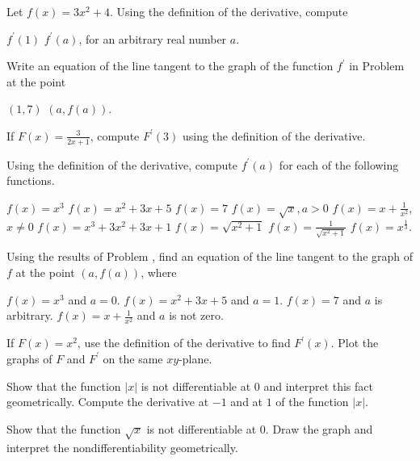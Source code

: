 \begin{exercises}

Let $f(x) = 3x^2 + 4$.
Using the definition of the derivative, compute
\begin{exenum}
\sx
$f^\prime(1)$
\sx
$f^\prime(a)$, for an arbitrary real number $a$.
\end{exenum}

Write an equation of the line tangent to the graph of the
function $f^\prime$ in Problem  at the point
\begin{exenum}
\sx
$(1,7)$
\sx
$(a, f(a))$.
\end{exenum}

If $F(x) = \frac3{2x+1}$, compute $F^\prime(3)$ using the
definition of the derivative.

Using the definition of the derivative, compute $f^\prime(a)$ for each
of the following functions.
\begin{exenum}
\sx
$f(x) = x^3$
\sx
$f(x) = x^2 + 3x +5$
\sx
$f(x) = 7$
\sx
$f(x) = \sqrt{x}, a > 0$
\sx
$f(x) = x + \frac1{x^2}$, $x \ne 0$
\sx
$f(x) = x^3 + 3x^2 + 3x + 1$
\sx
$f(x) = \sqrt{x^2 + 1}$
\sx
$f(x) = \frac1{\sqrt{x^2 + 1}}$
\sx
$f(x) = x^\frac13$.
\end{exenum}

Using the results of Problem , find an equation of the line
tangent to the graph of $f$ at the point $(a, f(a))$, where
\begin{exenum}
\sx
$f(x) = x^3$ and $a = 0$.
\sx
$f(x) = x^2 + 3x + 5$ and $a=1$.
\sx
$f(x) = 7$ and $a$ is arbitrary.
\sx
$f(x) = x + \frac1{x^2}$ and $a$ is not zero.
\end{exenum}

\begin{exenum}
\sx
If $F(x) = x^2$, use the definition of the derivative to find
$F^\prime(x)$.
\sx
Plot the graphs of $F$ and $F^\prime$ on the same $xy$-plane.
\end{exenum}

\begin{exenum}
\sx
Show that the function $|x|$ is not differentiable at $0$
and interpret this fact geometrically.
\sx
Compute the derivative at $-1$ and at $1$ of the function $|x|$.
\end{exenum}

Show that the function $\sqrt x$ is not differentiable at $0$.
Draw the graph and interpret the nondifferentiability geometrically.


\end{exercises}
